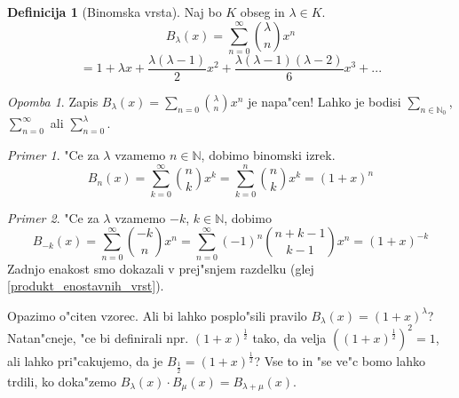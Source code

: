 \documentclass[a4paper,12pt]{article}
\theoremstyle{definition}
\newtheorem{defn}[counter]{Definicija}
\theoremstyle{remark}
\newtheorem*{ex}{Primer}
\newtheorem*{rem}{Opomba}
\newcommand{\N}{\mathbb{N}}
\begin{document}
\begin{defn}[Binomska vrsta]
	Naj bo $K$ obseg in $\lambda \in K$.
	\[B_{\lambda} (x) = \sum_{n = 0}^{\infty} \binom{\lambda}{n} x^n\]
	\[= 1 + \lambda x + \frac{\lambda (\lambda - 1)}{2} x^2 + \frac{\lambda (\lambda - 1) (\lambda - 2)}{6} x^3 + ...\]
\end{defn}

\begin{rem}
	Zapis $B_{\lambda}(x)=\sum_{n = 0} \binom{\lambda}{n} x^n$ je napa"cen! Lahko je bodisi $\sum_{n \in \N_0}$, $\sum_{n = 0}^{\infty}$ ali $\sum_{n = 0}^{\lambda}$.
\end{rem}

\begin{ex}
	"Ce za $\lambda$ vzamemo $n \in \N$, dobimo binomski izrek.
	\[B_n (x) = \sum_{k = 0}^{\infty} \binom{n}{k} x^k = \sum_{k = 0}^n \binom{n}{k} x^k = (1 + x)^n\]
\end{ex}

\begin{ex}
	"Ce za $\lambda$ vzamemo $-k$, $k \in \N$, dobimo
	\[B_{-k} (x) = \sum_{n = 0}^{\infty} \binom{-k}{n} x^n = \sum_{n = 0}^{\infty} (-1)^n \binom{n + k - 1}{k - 1} x^n = (1 + x)^{-k}\]
	Zadnjo enakost smo dokazali v prej"snjem razdelku (glej \ref{produkt_enostavnih_vrst}).
\end{ex}

Opazimo o"citen vzorec. Ali bi lahko posplo"sili pravilo $B_{\lambda}(x) = (1 + x)^{\lambda}$? Natan"cneje, "ce bi definirali npr. $(1 + x)^{\frac{1}{2}}$ tako, da velja $((1 + x)^{\frac{1}{2}})^2 = 1$, ali lahko pri"cakujemo, da je $B_{\frac{1}{2}} = (1+x)^{\frac{1}{2}}$? Vse to in "se ve"c bomo lahko trdili, ko doka"zemo $B_{\lambda} (x) \cdot B_{\mu} (x) = B_{\lambda + \mu} (x)$.
\end{document}
